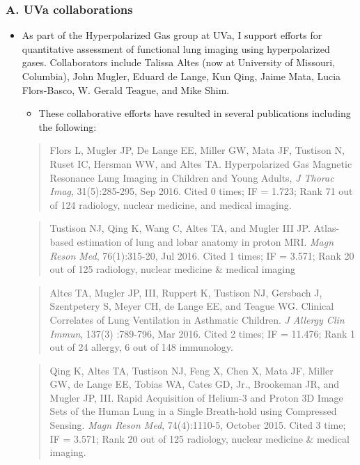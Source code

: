 \documentclass[11pt,]{article}
\providecommand{\tightlist}{%
  \setlength{\itemsep}{0pt}\setlength{\parskip}{0pt}}
\begin{document}
\subsubsection{A. UVa collaborations}\label{a.-uva-collaborations}

\begin{itemize}
\item
  As part of the Hyperpolarized Gas group at UVa, I support efforts for
  quantitative assessment of functional lung imaging using
  hyperpolarized gases. Collaborators include Talissa Altes (now at
  University of Missouri, Columbia), John Mugler, Eduard de Lange, Kun
  Qing, Jaime Mata, Lucia Flors-Basco, W. Gerald Teague, and Mike Shim.

  \begin{itemize}
  \tightlist
  \item
    These collaborative efforts have resulted in several publications
    including the following:
  \end{itemize}

  \begin{quote}
  Flors L, Mugler JP, De Lange EE, Miller GW, Mata JF, Tustison N, Ruset
  IC, Hersman WW, and Altes TA. Hyperpolarized Gas Magnetic Resonance
  Lung Imaging in Children and Young Adults, \emph{J Thorac Imag},
  31(5):285-295, Sep 2016. Cited 0 times; IF = 1.723; Rank 71 out of 124
  radiology, nuclear medicine, and medical imaging.
  \end{quote}

  \begin{quote}
  Tustison NJ, Qing K, Wang C, Altes TA, and Mugler III JP. Atlas-based
  estimation of lung and lobar anatomy in proton MRI. \emph{Magn Reson
  Med}, 76(1):315-20, Jul 2016. Cited 1 times; IF = 3.571; Rank 20 out
  of 125 radiology, nuclear medicine \& medical imaging
  \end{quote}

  \begin{quote}
  Altes TA, Mugler JP, III, Ruppert K, Tustison NJ, Gersbach J,
  Szentpetery S, Meyer CH, de Lange EE, and Teague WG. Clinical
  Correlates of Lung Ventilation in Asthmatic Children. \emph{J Allergy
  Clin Immun}, 137(3) :789-796, Mar 2016. Cited 2 times; IF = 11.476;
  Rank 1 out of 24 allergy, 6 out of 148 immunology.
  \end{quote}

  \begin{quote}
  Qing K, Altes TA, Tustison NJ, Feng X, Chen X, Mata JF, Miller GW, de
  Lange EE, Tobias WA, Cates GD, Jr., Brookeman JR, and Mugler JP, III.
  Rapid Acquisition of Helium-3 and Proton 3D Image Sets of the Human
  Lung in a Single Breath-hold using Compressed Sensing. \emph{Magn
  Reson Med}, 74(4):1110-5, October 2015. Cited 3 time; IF = 3.571; Rank
  20 out of 125 radiology, nuclear medicine \& medical imaging.
  \end{quote}


\end{itemize}
\end{document}
